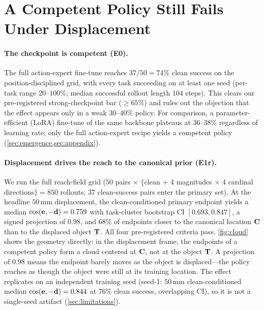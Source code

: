 \section{A Competent Policy Still Fails Under Displacement}
\label{sec:competent}

\paragraph{The checkpoint is competent (E0).} The full action-expert fine-tune reaches $37/50=74\%$ clean success on the position-disciplined grid, with every task succeeding on at least one seed (per-task range $20$--$100\%$; median successful rollout length $104$ steps). This clears our pre-registered strong-checkpoint bar ($\geq 65\%$) and rules out the objection that the effect appears only in a weak $30$--$40\%$ policy. For comparison, a parameter-efficient (LoRA) fine-tune of the same backbone plateaus at $36$--$38\%$ regardless of learning rate; only the full action-expert recipe yields a competent policy (\cref{sec:emergence,sec:appendix}).

\paragraph{Displacement drives the reach to the canonical prior (E1r).} We run the full reach-field grid ($50$ pairs $\times$ $\{$clean $+$ $4$ magnitudes $\times$ $4$ cardinal directions$\}=850$ rollouts; $37$ clean-success pairs enter the primary set). At the headline $50$\,mm displacement, the clean-conditioned primary endpoint yields a median $\operatorname{cos}(\mathbf{e},-\mathbf{d})=0.759$ with task-cluster bootstrap CI $[0.693,0.847]$, a signed projection of $0.98$, and $68\%$ of endpoints closer to the canonical location $\mathbf{C}$ than to the displaced object $\mathbf{T}$. All four pre-registered criteria pass. \cref{fig:cloud} shows the geometry directly: in the displacement frame, the endpoints of a competent policy form a cloud centered at $\mathbf{C}$, not at the object $\mathbf{T}$. A projection of $0.98$ means the endpoint barely moves as the object is displaced---the policy reaches as though the object were still at its training location. The effect replicates on an independent training seed (seed-1: $50$\,mm clean-conditioned median $\operatorname{cos}(\mathbf{e},-\mathbf{d})=0.844$ at $76\%$ clean success, overlapping CI), so it is not a single-seed artifact (\cref{sec:limitations}).

